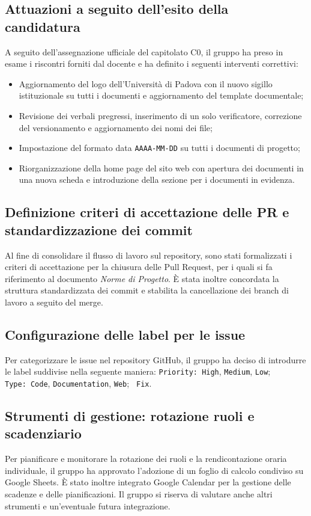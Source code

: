 \documentclass[11pt, a4paper]{article}
\begin{document}
\subsection{Attuazioni a seguito dell'esito della candidatura}
A seguito dell'assegnazione ufficiale del capitolato C0, il gruppo ha preso in esame i riscontri forniti dal docente e ha definito i seguenti interventi correttivi:
\begin{itemize}
    \item Aggiornamento del logo dell'Università di Padova con il nuovo sigillo istituzionale su tutti i documenti e aggiornamento del template documentale;
    \item Revisione dei verbali pregressi, inserimento di un solo verificatore, correzione del versionamento e aggiornamento dei nomi dei file;
    \item Impostazione del formato data \texttt{AAAA-MM-DD} su tutti i documenti di progetto;
    \item Riorganizzazione della home page del sito web con apertura dei documenti in una nuova scheda e introduzione della sezione per i documenti in evidenza.
\end{itemize}

\subsection{Definizione criteri di accettazione delle PR e standardizzazione dei commit}
Al fine di consolidare il flusso di lavoro sul repository, sono stati formalizzati i criteri di accettazione per la chiusura delle Pull Request, per i quali si fa riferimento al documento \textit{Norme di Progetto}.
È stata inoltre concordata la struttura standardizzata dei commit e stabilita la cancellazione dei branch di lavoro a seguito del merge.

\subsection{Configurazione delle label per le issue}
Per categorizzare le issue nel repository GitHub, il gruppo ha deciso di introdurre le label suddivise nella seguente maniera: \texttt{Priority:\ High}, \texttt{Medium}, \texttt{Low}; \texttt{ Type:\ Code}, \texttt{Documentation}, \texttt{Web}; \texttt{ Fix}.

\subsection{Strumenti di gestione: rotazione ruoli e scadenziario}
Per pianificare e monitorare la rotazione dei ruoli e la rendicontazione oraria individuale, il gruppo ha approvato l'adozione di un foglio di calcolo condiviso su Google Sheets. È stato inoltre integrato Google Calendar per la gestione delle scadenze e delle pianificazioni. Il gruppo si riserva di valutare anche altri strumenti e un'eventuale futura integrazione.
\end{document}

